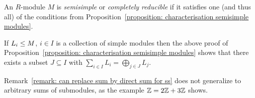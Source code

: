 \begin{definition}
  An $R$-module $M$ is \emph{semisimple} or \emph{completely reducible} if it satisfies one (and thus all) of the conditions from Proposition~\ref{proposition: characterisation semisimple modules}.
\end{definition}


\begin{remark}
  \label{remark: can replace sum by direct sum for ss}
  If $L_i \leq M$, $i \in I$ is a collection of simple modules then the above proof of Proposition~\ref{proposition: characterisation semisimple modules} shows that there exists a subset $J \subseteq I$ with $\sum_{i \in I} L_i = \bigoplus_{j \in J} L_j$.
\end{remark}


\begin{warning}
  Remark~\ref{remark: can replace sum by direct sum for ss} does not generalize to arbitrary sums of submodules, as the example $\mathbb{Z} = 2\mathbb{Z} + 3\mathbb{Z}$ shows.
\end{warning}


